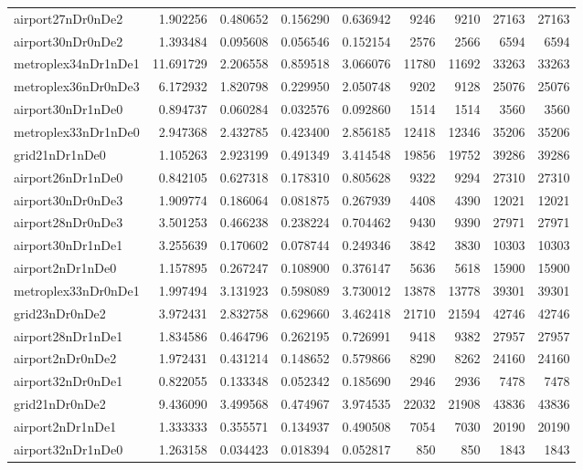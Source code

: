 \begin{longtable}{|l|r|r|r|r|r|r|r|r|}
airport27nDr0nDe2 & 1.902256 & 0.480652 & 0.156290 & 0.636942 & 9246 & 9210 & 27163 & 27163 \\
airport30nDr0nDe2 & 1.393484 & 0.095608 & 0.056546 & 0.152154 & 2576 & 2566 & 6594 & 6594 \\
metroplex34nDr1nDe1 & 11.691729 & 2.206558 & 0.859518 & 3.066076 & 11780 & 11692 & 33263 & 33263 \\
metroplex36nDr0nDe3 & 6.172932 & 1.820798 & 0.229950 & 2.050748 & 9202 & 9128 & 25076 & 25076 \\
airport30nDr1nDe0 & 0.894737 & 0.060284 & 0.032576 & 0.092860 & 1514 & 1514 & 3560 & 3560 \\
metroplex33nDr1nDe0 & 2.947368 & 2.432785 & 0.423400 & 2.856185 & 12418 & 12346 & 35206 & 35206 \\
grid21nDr1nDe0 & 1.105263 & 2.923199 & 0.491349 & 3.414548 & 19856 & 19752 & 39286 & 39286 \\
airport26nDr1nDe0 & 0.842105 & 0.627318 & 0.178310 & 0.805628 & 9322 & 9294 & 27310 & 27310 \\
airport30nDr0nDe3 & 1.909774 & 0.186064 & 0.081875 & 0.267939 & 4408 & 4390 & 12021 & 12021 \\
airport28nDr0nDe3 & 3.501253 & 0.466238 & 0.238224 & 0.704462 & 9430 & 9390 & 27971 & 27971 \\
airport30nDr1nDe1 & 3.255639 & 0.170602 & 0.078744 & 0.249346 & 3842 & 3830 & 10303 & 10303 \\
airport2nDr1nDe0 & 1.157895 & 0.267247 & 0.108900 & 0.376147 & 5636 & 5618 & 15900 & 15900 \\
metroplex33nDr0nDe1 & 1.997494 & 3.131923 & 0.598089 & 3.730012 & 13878 & 13778 & 39301 & 39301 \\
grid23nDr0nDe2 & 3.972431 & 2.832758 & 0.629660 & 3.462418 & 21710 & 21594 & 42746 & 42746 \\
airport28nDr1nDe1 & 1.834586 & 0.464796 & 0.262195 & 0.726991 & 9418 & 9382 & 27957 & 27957 \\
airport2nDr0nDe2 & 1.972431 & 0.431214 & 0.148652 & 0.579866 & 8290 & 8262 & 24160 & 24160 \\
airport32nDr0nDe1 & 0.822055 & 0.133348 & 0.052342 & 0.185690 & 2946 & 2936 & 7478 & 7478 \\
grid21nDr0nDe2 & 9.436090 & 3.499568 & 0.474967 & 3.974535 & 22032 & 21908 & 43836 & 43836 \\
airport2nDr1nDe1 & 1.333333 & 0.355571 & 0.134937 & 0.490508 & 7054 & 7030 & 20190 & 20190 \\
airport32nDr1nDe0 & 1.263158 & 0.034423 & 0.018394 & 0.052817 & 850 & 850 & 1843 & 1843 \\

\end{longtable}
